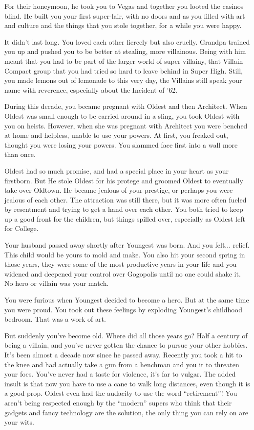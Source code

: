 \documentclass[char]{LRSguildcamp1}
\begin{document}
For their honeymoon, he took you to Vegas and together you looted the casinos blind. He built you your first super-lair, with no doors and as you filled with art and culture and the things that you stole together, for a while you were happy. 

It didn't last long. You loved each other fiercely but also cruelly. Grandpa trained you up and pushed you to be better at stealing, more villainous. Being with him meant that you had to be part of the larger world of super-villainy, that Villain Compact group that you had tried so hard to leave behind in Super High. Still, you made lemons out of lemonade to this very day, the Villains still speak your name with reverence, especially about the Incident of '62. 

During this decade, you became pregnant with Oldest and then Architect. When Oldest was small enough to be carried around in a sling, you took Oldest with you on heists. However, when she was pregnant with Architect you were benched at home and helpless, unable to use your powers.  At first, you freaked out, thought you were losing your powers. You slammed face first into a wall more than once.

Oldest had so much promise, and had a special place in your heart as your firstborn. But He stole Oldest for his protege and groomed Oldest to eventually take over Oldtown. He became jealous of your prestige, or perhaps you were jealous of each other. The attraction was still there, but it was more often fueled by resentment and trying to get a hand over each other.  You both tried to keep up a good front for the children, but things spilled over, especially as Oldest left for College. 

Your husband passed away shortly after Youngest was born. And you felt... relief. This child would be yours to mold and make. You also hit your second spring in those years, they were some of the most productive years in your life and you widened and deepened your control over Gogopolis until no one could shake it. No hero or villain was your match. 

You were furious when Youngest decided to become a hero. But at the same time you were proud. You took out these feelings by exploding Youngest’s childhood bedroom. That was a work of art. 

But suddenly you’ve become old. Where did all those years go? Half a century of being a villain, and you’ve never gotten the chance to pursue your other hobbies. It’s been almost a decade now since he passed away. Recently you took a hit to the knee and had actually take a gun from a henchman and you it to threaten your foes. You’ve never had a taste for violence, it’s far to vulgar. The added insult is that now you have to use a cane to walk long distances, even though it is a good prop. Oldest even had the audacity to use the word “retirement”! You aren’t being respected enough by the “modern” supers who think that their gadgets and fancy technology are the solution, the only thing you can rely on are your wits. 
\end{document}
